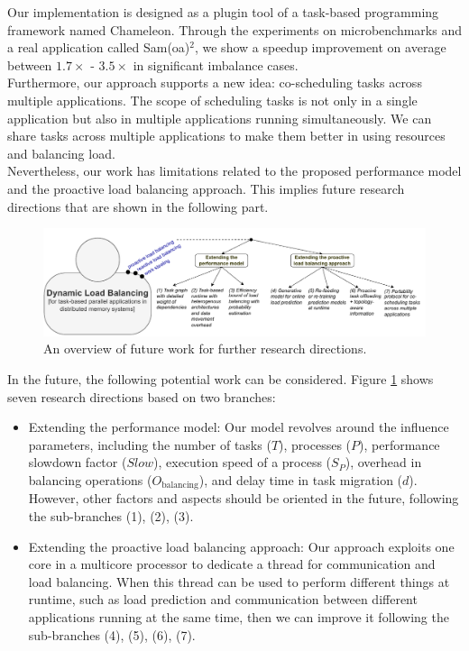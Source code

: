 Our implementation is designed as a plugin tool of a task-based programming framework named Chameleon. Through the experiments on microbenchmarks and a real application called Sam(oa)$^2$, we show a speedup improvement on average between $1.7\times$ - $3.5\times$ in significant imbalance cases.\\

Furthermore, our approach supports a new idea: co-scheduling tasks across multiple applications. The scope of scheduling tasks is not only in a single application but also in multiple applications running simultaneously. We can share tasks across multiple applications to make them better in using resources and balancing load.\\

Nevertheless, our work has limitations related to the proposed performance model and the proactive load balancing approach. This implies future research directions that are shown in the following part.\\


\begin{figure}[ht]
  \centering
  \includegraphics[scale=0.85]{./pictures/future_work/future_work_overview.pdf}
	\caption{An overview of future work for further research directions.}
	\label{fig:future_work_overview}
\end{figure}

In the future, the following potential work can be considered. Figure \ref{fig:future_work_overview} shows seven research directions based on two branches:

\begin{itemize}
	\item Extending the performance model: Our model revolves around the influence parameters, including the number of tasks ($T$), processes ($P$), performance slowdown factor ($Slow$), execution speed of a process ($S_{P}$), overhead in balancing operations ($O_{\text{balancing}}$), and delay time in task migration ($d$). However, other factors and aspects should be oriented in the future, following the sub-branches (1), (2), (3).
	\item Extending the proactive load balancing approach: Our approach exploits one core in a multicore processor to dedicate a thread for communication and load balancing. When this thread can be used to perform different things at runtime, such as load prediction and communication between different applications running at the same time, then we can improve it following the sub-branches (4), (5), (6), (7).
\end{itemize}

